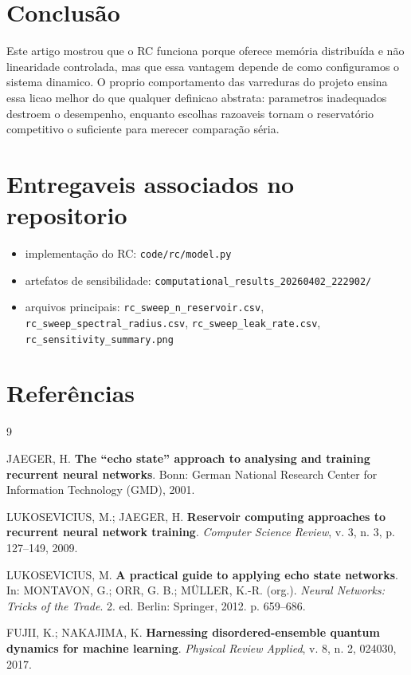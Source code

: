 \documentclass[12pt]{article}
\providecommand{\tightlist}{%
              \setlength{\itemsep}{0pt}\setlength{\parskip}{0pt}}
\begin{document}
\section{Conclusão}\label{10-conclusuxe3o}

Este artigo mostrou que o RC funciona porque oferece memória distribuída e não linearidade controlada, mas que essa vantagem depende de como configuramos o sistema dinamico. O proprio comportamento das varreduras do projeto ensina essa licao melhor do que qualquer definicao abstrata: parametros inadequados destroem o desempenho, enquanto escolhas razoaveis tornam o reservatório competitivo o suficiente para merecer comparação séria.

\section*{Entregaveis associados no repositorio}\label{entregaveis-associados-no-repositorio}

\begin{itemize}
\tightlist
\item
  implementação do RC: \texttt{code/rc/model.py}
\item
  artefatos de sensibilidade: \texttt{computational\_results\_20260402\_222902/}
\item
  arquivos principais: \texttt{rc\_sweep\_n\_reservoir.csv}, \texttt{rc\_sweep\_spectral\_radius.csv}, \texttt{rc\_sweep\_leak\_rate.csv}, \texttt{rc\_sensitivity\_summary.png}
\end{itemize}

\section{Referências}\label{referencias}

\begin{thebibliography}{9}

JAEGER, H. \textbf{The ``echo state'' approach to analysing and training recurrent neural networks}. Bonn: German National Research Center for Information Technology (GMD), 2001.

LUKOSEVICIUS, M.; JAEGER, H. \textbf{Reservoir computing approaches to recurrent neural network training}. \emph{Computer Science Review}, v. 3, n. 3, p. 127--149, 2009.

LUKOSEVICIUS, M. \textbf{A practical guide to applying echo state networks}. In: MONTAVON, G.; ORR, G. B.; MÜLLER, K.-R. (org.). \emph{Neural Networks: Tricks of the Trade}. 2. ed. Berlin: Springer, 2012. p. 659--686.

FUJII, K.; NAKAJIMA, K. \textbf{Harnessing disordered-ensemble quantum dynamics for machine learning}. \emph{Physical Review Applied}, v. 8, n. 2, 024030, 2017.

\end{thebibliography}

            
\end{document}
